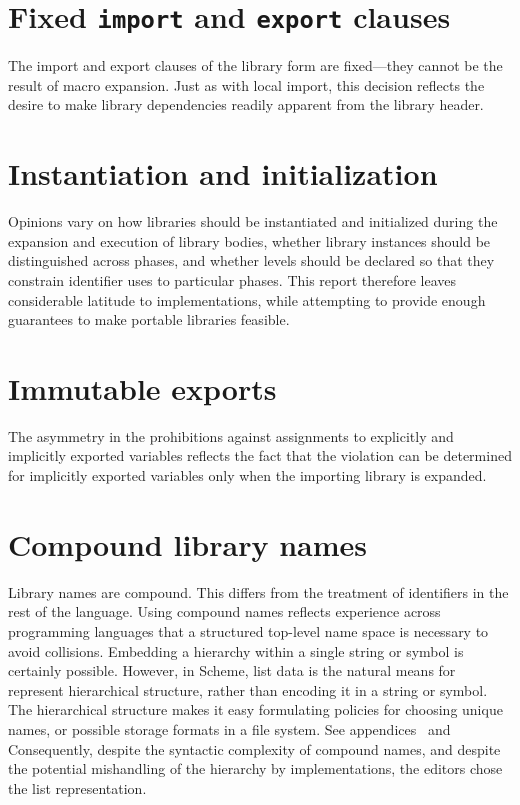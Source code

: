 \documentclass[twoside,twocolumn]{algol60}
\begin{document}
\section{Fixed {\tt import} and {\tt export} clauses}

The {\cf import} and {\cf export} clauses of the {\cf library} form
are fixed---they cannot be the result of macro expansion.  Just as
with local import, this decision reflects the desire to make library
dependencies readily apparent from the library header.

\section{Instantiation and initialization}

Opinions vary on how libraries should be instantiated and
initialized during the expansion and execution of library bodies,
whether library instances should be distinguished across phases,
and whether levels should be declared so that they constrain 
identifier uses to particular phases. This report therefore leaves
considerable latitude to implementations, while attempting to
provide enough guarantees to make portable libraries feasible.

\section{Immutable exports}

The asymmetry in the prohibitions against assignments to explicitly
and implicitly exported variables reflects the fact that the violation
can be determined for implicitly exported variables only when the
importing library is expanded.

\section{Compound library names}

Library names are compound.  This differs from the treatment of
identifiers in the rest of the language.  Using compound names
reflects experience across programming languages that a structured
top-level name space is necessary to avoid collisions.  Embedding a
hierarchy within a single string or symbol is certainly possible.
However, in Scheme, list data is the natural means for represent
hierarchical structure, rather than encoding it in a string or symbol.
The hierarchical structure makes it easy formulating policies for
choosing unique names, or possible storage formats in a file system.
See appendices~
and  Consequently, despite the syntactic complexity of compound
names, and despite the potential mishandling of the hierarchy by
implementations, the editors chose the list representation.
\end{document}
